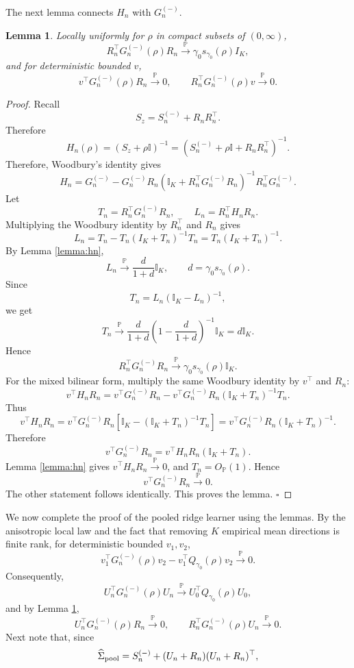 \documentclass{article}
\theoremstyle{plain}
\newtheorem{lemma}[theorem]{Lemma}
\theoremstyle{remark}
\def \I{\mathcal{I}}
\def \P{\mathbb{P}}
\def \I {\mathbb{I}}
\begin{document}
The next lemma connects $H_n$ with $G_n^{(-)}$.
\begin{lemma}\label{lemma:hn_gn}
    Locally uniformly for \(\rho\) in compact subsets of \((0,\infty)\),
\[
R_n^\top G_n^{(-)}(\rho)R_n
\overset{\P}{\longrightarrow}
\gamma_0s_{\gamma_0}(\rho)I_K,
\]
and for deterministic bounded \(v\),
\[
v^\top G_n^{(-)}(\rho)R_n\overset{\P}{\longrightarrow}0,
\qquad
R_n^\top G_n^{(-)}(\rho)v\overset{\P}{\longrightarrow}0.
\]
\end{lemma}
\begin{proof}
    Recall
\[
S_z=S_n^{(-)}+R_nR_n^\top.
\]
Therefore
\[
H_n(\rho)
=
(S_z+\rho \I)^{-1}
=
(S_n^{(-)}+\rho \I+R_nR_n^\top)^{-1}.
\]
Therefore, Woodbury's identity gives
\[
H_n
=
G_n^{(-)}
-
G_n^{(-)}R_n
\left(\I_K+R_n^\top G_n^{(-)}R_n\right)^{-1}
R_n^\top G_n^{(-)}.
\]
Let
\[
T_n=R_n^\top G_n^{(-)}R_n,
\qquad
L_n=R_n^\top H_nR_n.
\]
Multiplying the Woodbury identity by \(R_n^\top\) and \(R_n\) gives
\[
L_n
=
T_n-T_n(I_K+T_n)^{-1}T_n
=
T_n(I_K+T_n)^{-1}.
\]
By Lemma \ref{lemma:hn},
\[
L_n
\stackrel{\P}{\to}
\frac{d}{1+d}\I_K,
\qquad
d=\gamma_0s_{\gamma_0}(\rho).
\]
Since
\[
T_n=L_n(\I_K-L_n)^{-1},
\]
we get
\[
T_n
\stackrel{\P}{\to}
\frac{d}{1+d}
\left(1-\frac{d}{1+d}\right)^{-1}
\I_K
=
d\I_K.
\]
Hence
\[
R_n^\top G_n^{(-)}R_n
\stackrel{\P}{\to}
\gamma_0s_{\gamma_0}(\rho)\I_K.
\]
For the mixed bilinear form, multiply the same Woodbury identity by \(v^\top\) and \(R_n\):
\[
v^\top H_nR_n
=
v^\top G_n^{(-)}R_n
-
v^\top G_n^{(-)}R_n(\I_K+T_n)^{-1}T_n.
\]
Thus
\[
v^\top H_nR_n
=
v^\top G_n^{(-)}R_n
\left[
\I_K-(\I_K+T_n)^{-1}T_n
\right]
=
v^\top G_n^{(-)}R_n(\I_K+T_n)^{-1}.
\]
Therefore
\[
v^\top G_n^{(-)}R_n
=
v^\top H_nR_n(\I_K+T_n).
\]
Lemma \ref{lemma:hn} gives \(v^\top H_nR_n\stackrel{\P}{\to}0\), and \(T_n=O_{\P}(1)\). Hence
\[
v^\top G_n^{(-)}R_n\stackrel{\P}{\to}0.
\]
The other statement follows identically. This proves the lemma.
\(\square\)
\end{proof}
We now complete the proof of the pooled ridge learner using the lemmas. By the anisotropic local law \citep{knowles2017anisotropic} and the fact that removing \(K\) empirical mean directions is finite rank, for deterministic bounded \(v_1,v_2\),
\[
v_1^\top G_n^{(-)}(\rho)v_2
-
v_1^\top Q_{\gamma_0}(\rho)v_2
\overset{\P}{\longrightarrow}0.
\]
Consequently,
\[
U_n^\top G_n^{(-)}(\rho)U_n
\stackrel{\P}{\to}
U_0^\top Q_{\gamma_0}(\rho)U_0,
\]
and by Lemma \ref{lemma:hn_gn},
\[
U_n^\top G_n^{(-)}(\rho)R_n\stackrel{\P}{\to}0,
\qquad
R_n^\top G_n^{(-)}(\rho)U_n\stackrel{\P}{\to}0.
\]
Next note that, since
\[
\widehat\Sigma_{\rm pool}
=
S_n^{(-)}+(U_n+R_n)(U_n+R_n)^\top,
\]
\end{document}
